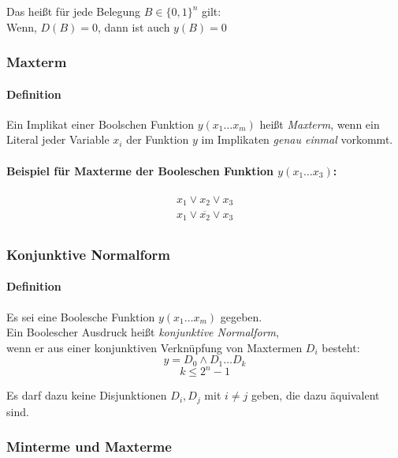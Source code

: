 \documentclass[a4paper]{scrartcl}
\begin{document}
			Das heißt für jede Belegung \( B \in \{0, 1\}^n \) gilt:\\
			Wenn, \( D(B) = 0 \), dann ist auch \( y(B) =0 \)
			
			\subsubsection{Maxterm}
			\paragraph{Definition}
			Ein Implikat einer Boolschen Funktion \( y( x_1 \dots x_m) \) heißt \emph{Maxterm}, wenn ein Literal jeder Variable \(x_i\) der Funktion \(y\) im Implikaten \emph{genau einmal} vorkommt.
			
			\paragraph{Beispiel für Maxterme der Booleschen Funktion \( y(x_1 \dots x_3) \):}
			\begin{align*}
				x_1 \vee x_2 \vee x_3 \\
				x_1 \vee \overline{x_2} \vee x_3 \\
			\end{align*} 
			
			\subsubsection{Konjunktive Normalform}
			\paragraph{Definition}
			Es sei eine Boolesche Funktion \( y( x_1 \dots x_m) \) gegeben.\\
			Ein Boolescher Ausdruck heißt \emph{konjunktive Normalform},\\
			wenn er aus einer konjunktiven Verknüpfung von Maxtermen \(D_i\) besteht:
			\[y = D_0 \wedge D_1 \dots D_k \]
			\[k \leq 2^n -1 \]
			
			Es darf dazu keine Disjunktionen \(D_i, D_j\) mit \( i \neq j \) geben, die dazu äquivalent sind.
			
			\subsubsection{Minterme und Maxterme}
\end{document}

